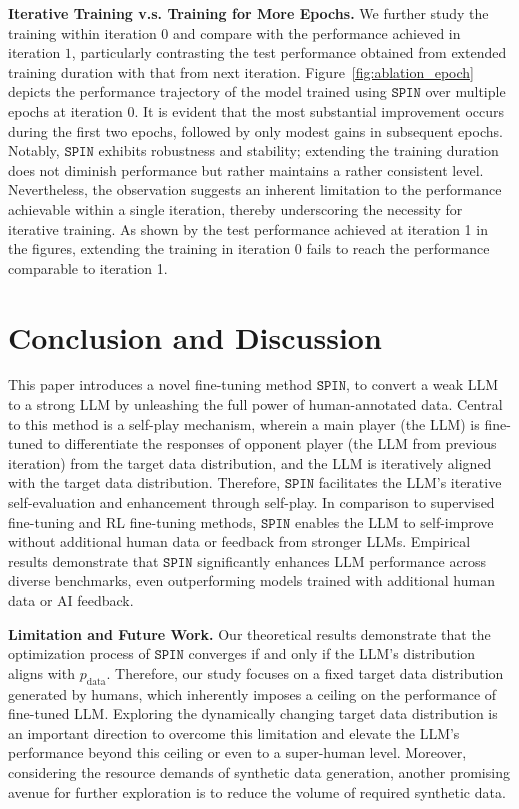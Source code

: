 \documentclass{article}
\newcommand{\method}{\texttt{SPIN}}
\begin{document}
\noindent \textbf{Iterative Training v.s. Training for More Epochs.} 
We further study the training within iteration $0$ and compare with the performance achieved in iteration $1$, particularly contrasting the test performance obtained from extended training duration with that from next iteration. 
Figure~\ref{fig:ablation_epoch} depicts the performance trajectory of the model trained using $\method$ over multiple epochs at iteration 0. 
It is evident that the most substantial improvement occurs during the first two epochs, followed by only modest gains in subsequent epochs. 
Notably, $\method$ exhibits robustness and stability; extending the training duration does not diminish performance but rather maintains a rather consistent level. 
Nevertheless, the observation suggests an inherent limitation to the performance achievable within a single iteration, thereby underscoring the necessity for iterative training. 
As shown by the test performance achieved at iteration 1 in the figures, extending the training in iteration 0 fails to reach the performance comparable to iteration 1.



\section{Conclusion and Discussion} 
This paper introduces a novel fine-tuning method $\method$, to convert a weak LLM to a strong LLM by unleashing the full power of human-annotated data. 
Central to this method is a self-play mechanism, wherein a main player (the LLM) is fine-tuned to differentiate the responses of opponent player (the LLM from previous iteration) from the target data distribution, and the LLM is iteratively aligned with the target data distribution. 
Therefore, $\method$ facilitates the LLM's iterative self-evaluation and enhancement through self-play.
In comparison to supervised fine-tuning and RL fine-tuning methods, $\method$ enables the LLM to self-improve without additional human data or feedback from stronger LLMs. Empirical results demonstrate that $\method$ significantly enhances LLM performance across diverse benchmarks, even outperforming models trained with additional human data or AI feedback.

\noindent \textbf{Limitation and Future Work.} Our theoretical results demonstrate that the optimization process of $\method$ converges if and only if the LLM's distribution aligns with $p_{\mathrm{data}}$. 
Therefore, our study focuses on a fixed target data distribution generated by humans, which inherently imposes a ceiling on the performance of fine-tuned LLM. 
Exploring the dynamically changing target data distribution is an important direction to overcome this limitation and elevate the LLM's performance beyond this ceiling or even to a super-human level. 
Moreover, considering the resource demands of synthetic data generation, another promising avenue for further exploration is to reduce the volume of required synthetic data. 
\end{document}
